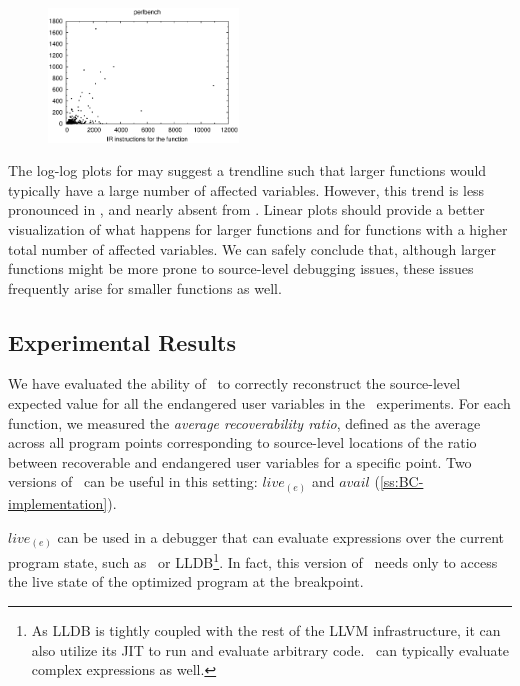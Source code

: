 \begin{figure}[!t]
\begin{center}
{\includegraphics[width=0.45\textwidth]{figures/CS-debug-tot-dead/tot-dead-perlbench-linear.eps}
}
\caption{\protect}
\end{center}
\end{figure}

The log-log plots for  may suggest a trendline such that larger functions would typically have a large number of affected variables. However, this trend is less pronounced in , and nearly absent from . Linear plots should provide a better visualization of what happens for larger functions and for functions with a higher total number of affected variables. We can safely conclude that, although larger functions might be more prone to source-level debugging issues, these issues frequently arise for smaller functions as well.

\subsection{Experimental Results}
We have evaluated the ability of \buildcomp\ to correctly reconstruct the source-level expected value for all the endangered user variables in the \speccpu\ experiments. For each function, we measured the {\em average recoverability ratio}, defined as the average across all program points corresponding to source-level locations of the ratio between recoverable and endangered user variables for a specific point. Two versions of \reconstruct\ can be useful in this setting: $live_{(e)}$ and $avail$ (\mysection\ref{ss:BC-implementation}).

$live_{(e)}$ can be used in a debugger that can evaluate expressions over the current program state, such as \gdb\ or LLDB\footnote{As LLDB is tightly coupled with the rest of the LLVM infrastructure, it can also utilize its JIT to run and evaluate arbitrary code. \gdb\ can typically evaluate complex expressions as well.}. In fact, this version of \reconstruct\ needs only to access the live state of the optimized program at the breakpoint.

